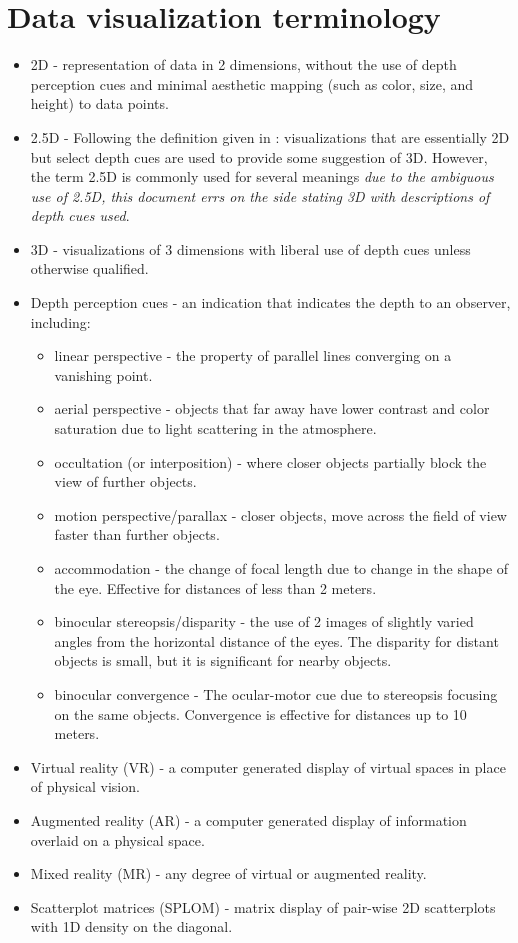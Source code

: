 \documentclass{monashthesis}
\begin{document}
\section{Data visualization terminology}\label{sec:3d-terminology}

\begin{itemize}
\tightlist
\item
  2D - representation of data in 2 dimensions, without the use of depth
  perception cues and minimal aesthetic mapping (such as color, size,
  and height) to data points.
\item
  2.5D - Following the definition given in
  \textcite{ware_designing_2000}: visualizations that are essentially 2D
  but select depth cues are used to provide some suggestion of 3D.
  However, the term 2.5D is commonly used for several meanings \emph{due
  to the ambiguous use of 2.5D, this document errs on the side stating
  3D with descriptions of depth cues used}.
\item
  3D - visualizations of 3 dimensions with liberal use of depth cues
  unless otherwise qualified.
\item
  Depth perception cues - an indication that indicates the depth to an
  observer, including:

  \begin{itemize}
  \tightlist
  \item
    linear perspective - the property of parallel lines converging on a
    vanishing point.
  \item
    aerial perspective - objects that far away have lower contrast and
    color saturation due to light scattering in the atmosphere.
  \item
    occultation (or interposition) - where closer objects partially
    block the view of further objects.
  \item
    motion perspective/parallax - closer objects, move across the field
    of view faster than further objects.
  \item
    accommodation - the change of focal length due to change in the
    shape of the eye. Effective for distances of less than 2 meters.
  \item
    binocular stereopsis/disparity - the use of 2 images of slightly
    varied angles from the horizontal distance of the eyes. The
    disparity for distant objects is small, but it is significant for
    nearby objects.
  \item
    binocular convergence - The ocular-motor cue due to stereopsis
    focusing on the same objects. Convergence is effective for distances
    up to 10 meters.
  \end{itemize}
\item
  Virtual reality (VR) - a computer generated display of virtual spaces
  in place of physical vision.
\item
  Augmented reality (AR) - a computer generated display of information
  overlaid on a physical space.
\item
  Mixed reality (MR) - any degree of virtual or augmented reality.
\item
  Scatterplot matrices (SPLOM) - matrix display of pair-wise 2D
  scatterplots with 1D density on the diagonal.
\end{itemize}
\end{document}
